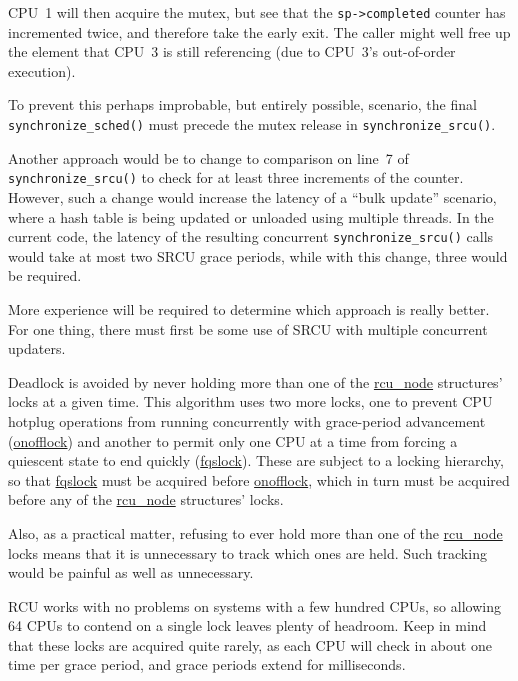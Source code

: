 	CPU~1 will then acquire the mutex, but see that the
	{\tt sp->completed} counter has incremented twice, and
	therefore take the early exit.
	The caller might well free up the element that CPU~3 is
	still referencing (due to CPU~3's out-of-order execution).

	To prevent this perhaps improbable, but entirely possible,
	scenario, the final {\tt synchronize\_sched()} must precede
	the mutex release in {\tt synchronize\_srcu()}.

	Another approach would be to change to comparison on
	line~7 of {\tt synchronize\_srcu()} to check for at
	least three increments of the counter.
	However, such a change would increase the latency of a
	``bulk update'' scenario, where a hash table is being updated
	or unloaded using multiple threads.
	In the current code, the latency of the resulting concurrent
	{\tt synchronize\_srcu()} calls would take at most two SRCU
	grace periods, while with this change, three would be required.

	More experience will be required to determine which approach
	is really better.
	For one thing, there must first be some use of SRCU with
	multiple concurrent updaters.


Deadlock is avoided by never holding more than one of the
\url{rcu_node} structures' locks at a given time.
This algorithm uses two more locks, one to prevent CPU hotplug operations
from running concurrently with grace-period advancement
(\url{onofflock}) and another
to permit only one CPU at a time from forcing a quiescent state
to end quickly (\url{fqslock}).
These are subject to a locking hierarchy, so that
\url{fqslock} must be acquired before
\url{onofflock}, which in turn must be acquired before
any of the \url{rcu_node} structures' locks.

Also, as a practical matter, refusing to ever hold more than
one of the \url{rcu_node} locks means that it is unnecessary
to track which ones are held.
Such tracking would be painful as well as unnecessary.


RCU works with no problems on
systems with a few hundred CPUs, so allowing 64 CPUs to contend on
a single lock leaves plenty of headroom.
Keep in mind that these locks are acquired quite rarely, as each
CPU will check in about one time per grace period, and grace periods
extend for milliseconds.

